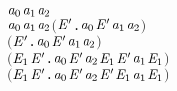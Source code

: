 \begin{itemize}
\begin{alltt}
       \ensuremath{\HOLBoundVar{a}\sb{\mathrm{0}}} \HOLTokenTransBegin\ensuremath{\HOLBoundVar{a}\sb{\mathrm{1}}}\HOLTokenTransEnd \ensuremath{\HOLBoundVar{a}\sb{\mathrm{2}}} \HOLSymConst{\HOLTokenEquiv{}}
       \ensuremath{\HOLBoundVar{a}\sb{\mathrm{0}}} \HOLSymConst{\ensuremath{=}} \ensuremath{\HOLBoundVar{a}\sb{\mathrm{1}}}\HOLSymConst{\ensuremath{\ldotp}}\ensuremath{\HOLBoundVar{a}\sb{\mathrm{2}}} \HOLSymConst{\HOLTokenDisj{}} \ensuremath{(}\HOLSymConst{\HOLTokenExists{}} \ensuremath{\HOLBoundVar{E}\sp{\prime}}. \ensuremath{\HOLBoundVar{a}\sb{\mathrm{0}}} \HOLSymConst{\ensuremath{=}}  \HOLSymConst{\ensuremath{+}} \ensuremath{\HOLBoundVar{E}\sp{\prime}} \HOLSymConst{\HOLTokenConj{}}  \HOLTokenTransBegin\ensuremath{\HOLBoundVar{a}\sb{\mathrm{1}}}\HOLTokenTransEnd \ensuremath{\HOLBoundVar{a}\sb{\mathrm{2}}}\ensuremath{)} \HOLSymConst{\HOLTokenDisj{}}
       \ensuremath{(}\HOLSymConst{\HOLTokenExists{}} \ensuremath{\HOLBoundVar{E}\sp{\prime}}. \ensuremath{\HOLBoundVar{a}\sb{\mathrm{0}}} \HOLSymConst{\ensuremath{=}} \ensuremath{\HOLBoundVar{E}\sp{\prime}} \HOLSymConst{\ensuremath{+}}  \HOLSymConst{\HOLTokenConj{}}  \HOLTokenTransBegin\ensuremath{\HOLBoundVar{a}\sb{\mathrm{1}}}\HOLTokenTransEnd \ensuremath{\HOLBoundVar{a}\sb{\mathrm{2}}}\ensuremath{)} \HOLSymConst{\HOLTokenDisj{}}
       \ensuremath{(}\HOLSymConst{\HOLTokenExists{}} \ensuremath{\HOLBoundVar{E}\sb{\mathrm{1}}} \ensuremath{\HOLBoundVar{E}\sp{\prime}}. \ensuremath{\HOLBoundVar{a}\sb{\mathrm{0}}} \HOLSymConst{\ensuremath{=}}  \HOLSymConst{\ensuremath{\mid}} \ensuremath{\HOLBoundVar{E}\sp{\prime}} \HOLSymConst{\HOLTokenConj{}} \ensuremath{\HOLBoundVar{a}\sb{\mathrm{2}}} \HOLSymConst{\ensuremath{=}} \ensuremath{\HOLBoundVar{E}\sb{\mathrm{1}}} \HOLSymConst{\ensuremath{\mid}} \ensuremath{\HOLBoundVar{E}\sp{\prime}} \HOLSymConst{\HOLTokenConj{}}  \HOLTokenTransBegin\ensuremath{\HOLBoundVar{a}\sb{\mathrm{1}}}\HOLTokenTransEnd \ensuremath{\HOLBoundVar{E}\sb{\mathrm{1}}}\ensuremath{)} \HOLSymConst{\HOLTokenDisj{}}
       \ensuremath{(}\HOLSymConst{\HOLTokenExists{}} \ensuremath{\HOLBoundVar{E}\sb{\mathrm{1}}} \ensuremath{\HOLBoundVar{E}\sp{\prime}}. \ensuremath{\HOLBoundVar{a}\sb{\mathrm{0}}} \HOLSymConst{\ensuremath{=}} \ensuremath{\HOLBoundVar{E}\sp{\prime}} \HOLSymConst{\ensuremath{\mid}}  \HOLSymConst{\HOLTokenConj{}} \ensuremath{\HOLBoundVar{a}\sb{\mathrm{2}}} \HOLSymConst{\ensuremath{=}} \ensuremath{\HOLBoundVar{E}\sp{\prime}} \HOLSymConst{\ensuremath{\mid}} \ensuremath{\HOLBoundVar{E}\sb{\mathrm{1}}} \HOLSymConst{\HOLTokenConj{}}  \HOLTokenTransBegin\ensuremath{\HOLBoundVar{a}\sb{\mathrm{1}}}\HOLTokenTransEnd \ensuremath{\HOLBoundVar{E}\sb{\mathrm{1}}}\ensuremath{)} \HOLSymConst{\HOLTokenDisj{}}

\end{alltt}
\end{itemize}
